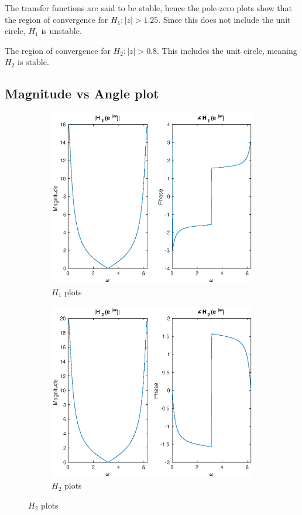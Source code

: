 \documentclass{article}
\begin{document}
The transfer functions are said to be stable, hence the pole-zero plots show that the region of convergence for \(H_1: |z| > 1.25\). Since this does not include the unit circle, \(H_1\) is unstable.

The region of convergence for \(H_2: |z| > 0.8\). This includes the unit circle, meaning \(H_2\) is stable.

\subsection{Magnitude vs Angle plot}
\begin{figure}[H]
	\centering
	\begin{subfigure}[b]{0.4\linewidth}
		\centering
		\includegraphics[width=\linewidth]{magh1}
		\caption{\(H_1\) plots}
	\end{subfigure}
	\begin{subfigure}[b]{0.4\linewidth}
		\centering
		\includegraphics[width=\linewidth]{magh2}
		\caption{\(H_2\) plots}
	\end{subfigure}
\end{figure}
\end{document}
